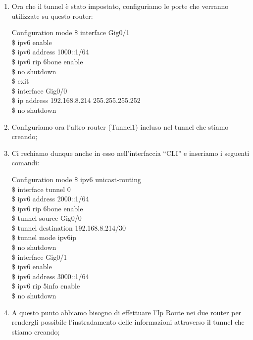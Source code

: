 \begin{enumerate}
\begin{fcmds}{Configuration mode}
        \$ tunnel destination 192.168.8.218/30\\
        \$ tunnel mode ipv6ip\\
        \$ no shutdown
    \end{fcmds}
    \item Ora che il tunnel è stato impostato, configuriamo le porte che verranno utilizzate su questo router:\par
    \begin{fcmds}{Configuration mode}
        \$ interface Gig0/1\\
        \$ ipv6 enable\\
        \$ ipv6 address 1000::1/64\\
        \$ ipv6 rip 6bone enable\\
        \$ no shutdown\\
        \$ exit\\
        \$ interface Gig0/0\\
        \$ ip address 192.168.8.214 255.255.255.252\\
        \$ no shutdown
    \end{fcmds}
    \item Configuriamo ora l’altro router (Tunnel1) incluso nel tunnel che stiamo creando;
    \item Ci rechiamo dunque anche in esso nell’interfaccia “CLI” e inseriamo i seguenti comandi:\par
    \begin{fcmds}{Configuration mode}
        \$ ipv6 unicast-routing\\
        \$ interface tunnel 0\\
        \$ ipv6 address 2000::1/64\\
        \$ ipv6 rip 6bone enable\\
        \$ tunnel source Gig0/0\\
        \$ tunnel destination 192.168.8.214/30\\
        \$ tunnel mode ipv6ip\\
        \$ no shutdown\\
        \$ interface Gig0/1\\
        \$ ipv6 enable\\
        \$ ipv6 address 3000::1/64\\
        \$ ipv6 rip 5info enable\\
        \$ no shutdown
    \end{fcmds}
    \item A questo punto abbiamo bisogno di effettuare l’Ip Route nei due router per rendergli possibile l’instradamento delle informazioni attraverso il tunnel che stiamo creando;

\end{enumerate}
